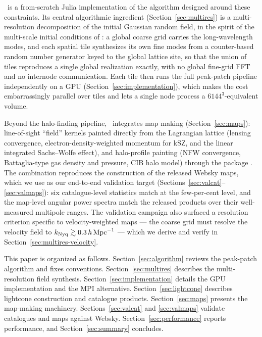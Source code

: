 \ppjl\ is a from-scratch Julia implementation of the algorithm designed around
these constraints. Its central algorithmic ingredient
(Section~\ref{sec:multires}) is a multi-resolution decomposition of the
initial Gaussian random field, in the spirit of the multi-scale initial
conditions of  \citep{HahnAbel2011}: a global coarse grid carries
the long-wavelength modes, and each spatial tile synthesizes its own fine
modes from a counter-based random number generator keyed to the global lattice
site, so that the union of tiles reproduces a single global realization
exactly, with no global fine-grid FFT and no internode communication. Each
tile then runs the full peak-patch pipeline independently on a GPU
(Section~\ref{sec:implementation}), which makes the cost embarrassingly
parallel over tiles and lets a single node process a $6144^3$-equivalent
volume.

Beyond the halo-finding pipeline, \ppjl\ integrates map making
(Section~\ref{sec:maps}): line-of-sight ``field'' kernels painted directly
from the Lagrangian lattice (lensing convergence, electron-density-weighted
momentum for kSZ, and the linear integrated Sachs--Wolfe effect), and
halo-profile painting (NFW convergence, Battaglia-type gas density and
pressure, CIB halo model) through the  package
\citep{XGPaint}. The combination reproduces the construction of the released
Websky maps, which we use as our end-to-end validation target
(Sections~\ref{sec:valcat}--\ref{sec:valmaps}): six catalogue-level statistics
match at the few-per-cent level, and the map-level angular power spectra match
the released products over their well-measured multipole ranges. The
validation campaign also surfaced a resolution criterion specific to
velocity-weighted maps --- the coarse grid must resolve the velocity field to
$k_{\rm Nyq}\gtrsim 0.3\,h\,{\rm Mpc}^{-1}$ --- which we derive and verify in
Section~\ref{sec:multires-velocity}.

This paper is organized as follows. Section~\ref{sec:algorithm} reviews the
peak-patch algorithm and fixes conventions. Section~\ref{sec:multires}
describes the multi-resolution field synthesis. Section~\ref{sec:implementation}
details the GPU implementation and the MPI alternative.
Section~\ref{sec:lightcone} describes lightcone construction and catalogue
products. Section~\ref{sec:maps} presents the map-making machinery.
Sections~\ref{sec:valcat} and \ref{sec:valmaps} validate catalogues and maps
against Websky. Section~\ref{sec:performance} reports performance, and
Section~\ref{sec:summary} concludes.
